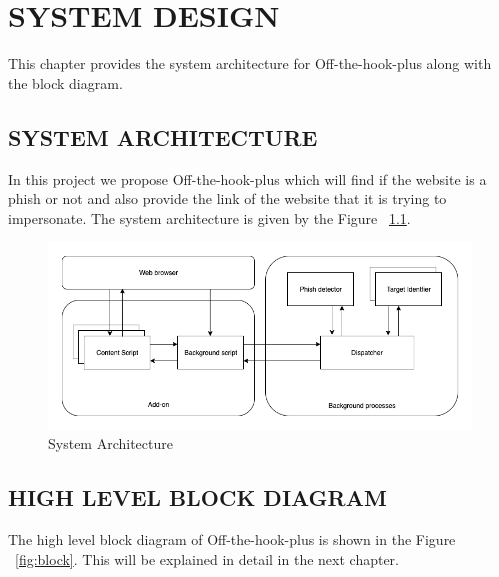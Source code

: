 
\chapter{SYSTEM DESIGN} %

This chapter provides the system architecture for Off-the-hook-plus along with the block diagram.

\section{SYSTEM ARCHITECTURE}

In this project we propose Off-the-hook-plus which will find if the website is a phish or not and also provide the link of the website that it is trying to impersonate. The system architecture is given by the Figure ~\ref{fig:system}.

\begin{figure}[htp]
\centering
\includegraphics[scale=0.5]{Figures/image10.png}
\caption{System Architecture}
\label{fig:system}
\end{figure}

\section{HIGH LEVEL BLOCK DIAGRAM}

The high level block diagram of Off-the-hook-plus is shown in the Figure ~\ref{fig:block}. This will be explained in detail in the next chapter.

\newpage

